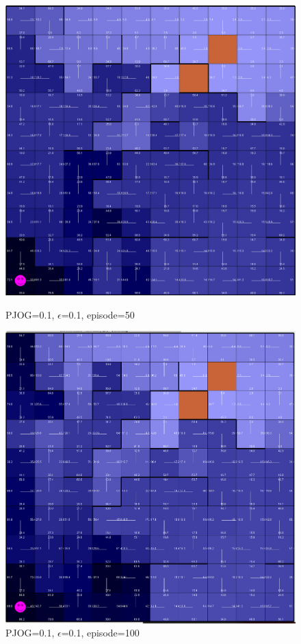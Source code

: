 \documentclass[11pt]{article}
\begin{document}
\begin{figure}[!htb]
   \begin{minipage}{0.34\textwidth}
     \centering
     \includegraphics[width=1.2\linewidth]{../figures/q2_1_50.png}
     \caption{PJOG=0.1, $\epsilon$=0.1, episode=50}\label{Fig:q2_1_50}
   \end{minipage}\hfill
   \begin{minipage}{0.34\textwidth}
     \centering
     \includegraphics[width=1.2\linewidth]{../figures/q2_1_100.png}
     \caption{PJOG=0.1, $\epsilon$=0.1, episode=100}\label{Fig:q2_1_100}
   \end{minipage}
\end{figure}
\end{document}
